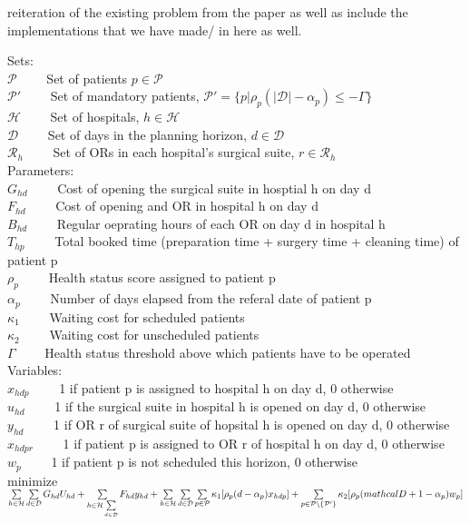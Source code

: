 reiteration of the existing problem from the paper as well as include the implementations that we have made/
in here as well.

Sets:\\
$\mathcal{P} \qquad$ Set of patients $p \in \mathcal{P}$\\
$\mathcal{P}{'} \qquad$ Set of mandatory patients, $\mathcal{P}{'} = \lbrace p|\rho_{p}(|\mathcal{D}|-\alpha_{p})\leq-\Gamma\rbrace$\\
$\mathcal{H} \qquad$ Set of hospitals, $h \in \mathcal{H}$\\
$\mathcal{D} \qquad$ Set of days in the planning horizon, $d \in \mathcal{D}$\\
$\mathcal{R}_{h} \qquad$ Set of ORs in each hospital's surgical suite, $r \in \mathcal{R}_{h}$\\
Parameters:\\
$G_{hd} \qquad$ Cost of opening the surgical suite in hosptial h on day d\\
$F_{hd} \qquad$ Cost of opening and OR in hospital h on day d\\
$B_{hd} \qquad$ Regular oeprating hours of each OR on day d in hospital h\\
$T_{hp} \qquad$ Total booked time (preparation time + surgery time + cleaning time) of patient p\\
$\rho_{p} \qquad$ Health status score assigned to patient p\\
$\alpha_{p} \qquad$ Number of days elapsed from the referal date of patient p\\
$\kappa_{1} \qquad$ Waiting cost for scheduled patients\\
$\kappa_{2} \qquad$ Waiting cost for unscheduled patients\\
$\Gamma \qquad$ Health status threshold above which patients have to be operated\\
Variables:\\
$x_{hdp} \qquad$ 1 if patient p is assigned to hospital h on day d, 0 otherwise\\
$u_{hd} \qquad$ 1 if the surgical suite  in hospital h is opened on day d, 0 otherwise\\
$y_{hd} \qquad$ 1 if OR r of surgical suite of hopsital h is opened on day d, 0 otherwise\\
$x_{hdpr} \qquad$ 1 if patient p is assigned to OR r of hospital h on day d, 0 otherwise\\
$w_{p} \qquad$ 1 if patient p is not scheduled this horizon, 0 otherwise\\ 

minimize $\sum\limits_{h \in \mathcal{H}} \sum\limits_{d \in \mathcal{D}} G_{hd} U_{hd} + \sum\limits_{h \in \mathcal{H} \sum\limits_{d \in \mathcal{D}}} F_{hd} y_{hd} \\
+ \sum\limits_{h \in \mathcal{H}} \sum\limits_{d \in \mathcal{D}} \sum\limits_{p \in \mathcal{P}} \kappa_{1} [\rho_{p} (d - \alpha_{p}) x_{hdp}]\\
+ \sum\limits_{p \in \mathcal{P} \setminus \lbrace \mathcal{P}{'} \rbrace } \kappa_{2} [\rho_{p}( mathcal{D} + 1 -\alpha_{p} ) w_{p}]$
